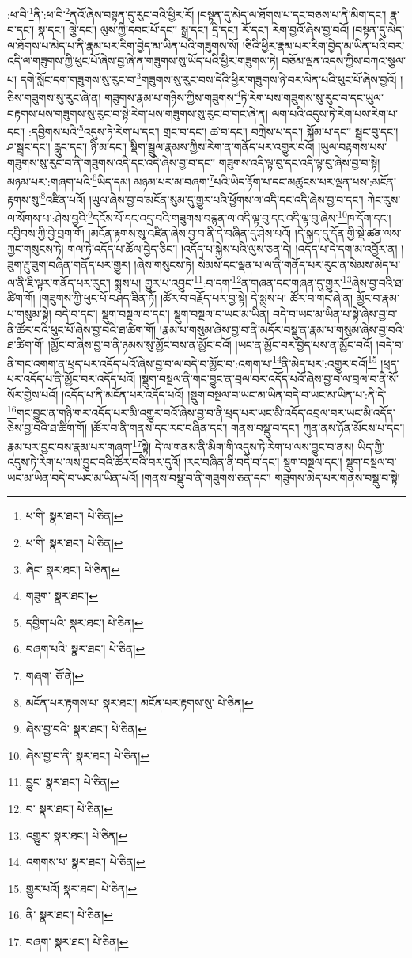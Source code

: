 :ཕ་བི་\footnote{ཕ་གི་  སྣར་ཐང་།  པེ་ཅིན། }ནི་:ཕ་བི་\footnote{ཕ་གི་  སྣར་ཐང་།  པེ་ཅིན། }ནའོ་ཞེས་བསྟན་དུ་རུང་བའི་ཕྱིར་རོ། །བསྟན་དུ་མེད་ལ་ཐོགས་པ་དང་བཅས་པ་ནི་མིག་དང་། རྣ་བ་དང་། སྣ་དང་། ལྕེ་དང་། ལུས་ཀྱི་དབང་པོ་དང་། སྒྲ་དང་། དྲི་དང་། རོ་དང་། རེག་བྱའོ་ཞེས་བྱ་བའོ། །བསྟན་དུ་མེད་ལ་ཐོགས་པ་མེད་པ་ནི་རྣམ་པར་རིག་བྱེད་མ་ཡིན་པའི་གཟུགས་སོ། །ཅིའི་ཕྱིར་རྣམ་པར་རིག་བྱེད་མ་ཡིན་པའི་བར་འདི་ལ་གཟུགས་ཀྱི་ཕུང་པོ་ཞེས་བྱ་ཞེ་ན་གཟུགས་སུ་ཡོད་པའི་ཕྱིར་གཟུགས་ཏེ། བཅོམ་ལྡན་འདས་ཀྱིས་བཀའ་སྩལ་པ། དགེ་སློང་དག་གཟུགས་སུ་རུང་བ་\footnote{ཞིང་  སྣར་ཐང་།  པེ་ཅིན། }གཟུགས་སུ་རུང་བས་དེའི་ཕྱིར་གཟུགས་ཉེ་བར་ལེན་པའི་ཕུང་པོ་ཞེས་བྱའོ། །ཅིས་གཟུགས་སུ་རུང་ཞེ་ན། གཟུགས་རྣམ་པ་གཉིས་ཀྱིས་གཟུགས་\footnote{གཟུག་  སྣར་ཐང་། }ཏེ་རེག་པས་གཟུགས་སུ་རུང་བ་དང་ཡུལ་བརྟགས་པས་གཟུགས་སུ་རུང་བ་སྟེ་རེག་པས་གཟུགས་སུ་རུང་བ་གང་ཞེ་ན། ལག་པའི་འདུས་ཏེ་རེག་པས་རེག་པ་དང་། :དབྱིགས་པའི་\footnote{དབྱིག་པའི་  སྣར་ཐང་།  པེ་ཅིན། }འདུས་ཏེ་རེག་པ་དང་། གྲང་བ་དང་། ཚ་བ་དང་། བཀྲེས་པ་དང་། སྐོམ་པ་དང་། སྦྲང་བུ་དང་། ཤ་སྦྲང་དང་། རླུང་དང་། ཉི་མ་དང་། སྡིག་སྦྲུལ་རྣམས་ཀྱིས་རེག་ན་གནོད་པར་འགྱུར་བའོ། །ཡུལ་བརྟགས་པས་གཟུགས་སུ་རུང་བ་ནི་གཟུགས་འདི་དང་འདི་ཞེས་བྱ་བ་དང་། གཟུགས་འདི་ལྟ་བུ་དང་འདི་ལྟ་བུ་ཞེས་བྱ་བ་སྟེ། མཉམ་པར་:གཞག་པའི་\footnote{བཞག་པའི་  སྣར་ཐང་།  པེ་ཅིན། }ཡིད་དམ། མཉམ་པར་མ་བཞག་\footnote{གཞག་  ཅོ་ནེ། }པའི་ཡིད་རྟོག་པ་དང་མཚུངས་པར་ལྡན་པས་:མངོན་རྟགས་སུ་\footnote{མངོན་པར་རྟགས་པ་  སྣར་ཐང་། མངོན་པར་རྟགས་སུ་  པེ་ཅིན། }འཛིན་པའོ། །ཡུལ་ཞེས་བྱ་བ་མངོན་སུམ་དུ་གྱུར་པའི་ཕྱོགས་ལ་འདི་དང་འདི་ཞེས་བྱ་བ་དང་། ཀེང་རུས་ལ་སོགས་པ་:ཤེས་བྱའི་\footnote{ཞེས་བྱ་བའི་  སྣར་ཐང་།  པེ་ཅིན། }དངོས་པོ་དང་འདྲ་བའི་གཟུགས་བརྙན་ལ་འདི་ལྟ་བུ་དང་འདི་ལྟ་བུ་ཞེས་\footnote{ཞེས་བྱ་བ་ནི་  སྣར་ཐང་།  པེ་ཅིན། }ཁ་དོག་དང་། དབྱིབས་ཀྱི་བྱེ་བྲག་གོ། །མངོན་རྟགས་སུ་འཛིན་ཞེས་བྱ་བ་ནི་དེ་བཞིན་དུ་ཤེས་པའོ། །དེ་སྐད་དུ་དོན་གྱི་སྡེ་ཚན་ལས་ཀྱང་གསུངས་ཏེ། གལ་ཏེ་འདོད་པ་ཚོལ་བྱེད་ཅིང་། །འདོད་པ་སྐྱེས་པའི་ལུས་ཅན་དེ། །འདོད་པ་དེ་དག་མ་འབྱོར་ན། །ཟུག་རྔུ་ཟུག་བཞིན་གནོད་པར་གྱུར། །ཞེས་གསུངས་ཏེ། སེམས་དང་ལྡན་པ་ལ་ནི་གནོད་པར་རུང་ན་སེམས་མེད་པ་ལ་ནི་ཇི་ལྟར་གནོད་པར་རུང་། སྨྲས་པ། གྱུར་པ་འབྱུང་\footnote{བྱུང་  སྣར་ཐང་།  པེ་ཅིན། }:བ་དག་\footnote{བ་  སྣར་ཐང་།  པེ་ཅིན། }ན་གཞན་དང་གཞན་དུ་གྱུར་\footnote{འགྱུར་  སྣར་ཐང་།  པེ་ཅིན། }ཞེས་བྱ་བའི་ཐ་ཚིག་གོ། །གཟུགས་ཀྱི་ཕུང་པོ་བཤད་ཟིན་ཏོ། །ཚོར་བ་བརྗོད་པར་བྱ་སྟེ། དེ་སྨྲས་པ། ཚོར་བ་གང་ཞེ་ན། མྱོང་བ་རྣམ་པ་གསུམ་སྟེ། བདེ་བ་དང་། སྡུག་བསྔལ་བ་དང་། སྡུག་བསྔལ་བ་ཡང་མ་ཡིན། བདེ་བ་ཡང་མ་ཡིན་པ་སྟེ་ཞེས་བྱ་བ་ནི་ཚོར་བའི་ཕུང་པོ་ཞེས་བྱ་བའི་ཐ་ཚིག་གོ། །རྣམ་པ་གསུམ་ཞེས་བྱ་བ་ནི་མདོར་བསྡུ་ན་རྣམ་པ་གསུམ་ཞེས་བྱ་བའི་ཐ་ཚིག་གོ། །མྱོང་བ་ཞེས་བྱ་བ་ནི་ཉམས་སུ་མྱོང་བས་ན་མྱོང་བའོ། །ཡང་ན་མྱོང་བར་བྱེད་པས་ན་མྱོང་བའོ། །བདེ་བ་ནི་གང་འགག་ན་ཕྲད་པར་འདོད་པའོ་ཞེས་བྱ་བ་ལ་བདེ་བ་མྱོང་བ་:འགག་པ་\footnote{འགགས་པ་  སྣར་ཐང་།  པེ་ཅིན། }ནི་མེད་པར་:འགྱུར་བའོ།\footnote{གྱུར་པའོ།  སྣར་ཐང་།  པེ་ཅིན། } །ཕྲད་པར་འདོད་པ་ནི་མྱོང་བར་འདོད་པའོ། །སྡུག་བསྔལ་ནི་གང་བྱུང་ན་བྲལ་བར་འདོད་པའོ་ཞེས་བྱ་བ་ལ་བྲལ་བ་ནི་སོ་སོར་གྱེས་པའོ། །འདོད་པ་ནི་མངོན་པར་འདོད་པའོ། །སྡུག་བསྔལ་བ་ཡང་མ་ཡིན་བདེ་བ་ཡང་མ་ཡིན་པ་:ནི་དེ་\footnote{ནི་  སྣར་ཐང་།  པེ་ཅིན། }གང་བྱུང་ན་གཉི་གར་འདོད་པར་མི་འགྱུར་བའོ་ཞེས་བྱ་བ་ནི་ཕྲད་པར་ཡང་མི་འདོད་འབྲལ་བར་ཡང་མི་འདོད་ཅེས་བྱ་བའི་ཐ་ཚིག་གོ། །ཚོར་བ་ནི་གནས་དང་རང་བཞིན་དང་། གནས་བསྡུ་བ་དང་། ཀུན་ནས་ཉོན་མོངས་པ་དང་། རྣམ་པར་བྱང་བས་རྣམ་པར་གཞག་\footnote{བཞག་  སྣར་ཐང་།  པེ་ཅིན། }སྟེ། དེ་ལ་གནས་ནི་མིག་གི་འདུས་ཏེ་རེག་པ་ལས་བྱུང་བ་ནས། ཡིད་ཀྱི་འདུས་ཏེ་རེག་པ་ལས་བྱུང་བའི་ཚོར་བའི་བར་དུའོ། །རང་བཞིན་ནི་བདེ་བ་དང་། སྡུག་བསྔལ་དང་། སྡུག་བསྔལ་བ་ཡང་མ་ཡིན་བདེ་བ་ཡང་མ་ཡིན་པའོ། །གནས་བསྡུ་བ་ནི་གཟུགས་ཅན་དང་། གཟུགས་མེད་པར་གནས་བསྡུ་བ་སྟེ། 